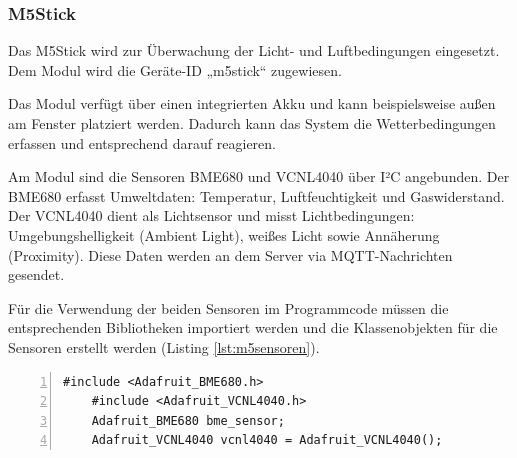 \documentclass[12pt, letterpaper]{article}
\begin{document}
  \subsubsection{M5Stick}
  \par Das M5Stick wird zur Überwachung der Licht- und Luftbedingungen eingesetzt. Dem Modul wird die Geräte-ID „m5stick“ zugewiesen.
  \par Das Modul verfügt über einen integrierten Akku und kann beispielsweise außen am Fenster platziert werden. Dadurch kann das System die Wetterbedingungen erfassen und entsprechend darauf reagieren.
  \par Am Modul sind die Sensoren BME680 und VCNL4040 über I²C angebunden. Der BME680 erfasst Umweltdaten: Temperatur, Luftfeuchtigkeit und Gaswiderstand. Der VCNL4040 dient als Lichtsensor und misst Lichtbedingungen: Umgebungshelligkeit (Ambient Light), weißes Licht sowie Annäherung (Proximity). Diese Daten werden an dem Server via MQTT-Nachrichten gesendet. 
  \par Für die Verwendung der beiden Sensoren im Programmcode müssen die entsprechenden Bibliotheken importiert werden und die Klassenobjekten für die Sensoren erstellt werden (Listing \ref{lst:m5sensoren}). 
  \begin{lstlisting}[frame=single, style=cpp, numbers=left, label={lst:m5sensoren}, caption={M5Stick: Sensoren}]
    #include <Adafruit_BME680.h>
    #include <Adafruit_VCNL4040.h>
    Adafruit_BME680 bme_sensor; 
    Adafruit_VCNL4040 vcnl4040 = Adafruit_VCNL4040();
  \end{lstlisting}
\end{document}
